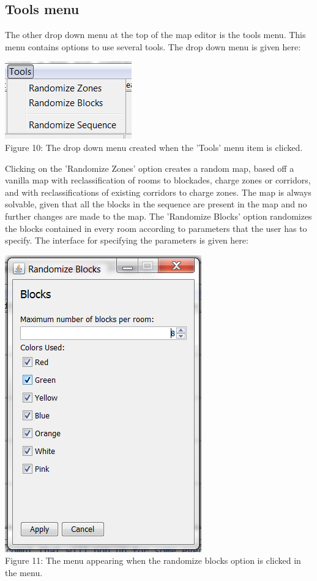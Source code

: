\subsection{Tools menu}
The other drop down menu at the top of the map editor is the tools menu. This menu contains options to use several tools. The drop down menu is given here:
\begin{center}
	\centering
	\includegraphics{EnvironmentStore/DropDownTools.png}\\
	Figure 10: The drop down menu created when the 'Tools' menu item is clicked.
\end{center}
Clicking on the 'Randomize Zones' option creates a random map, based off a vanilla map with reclassification of rooms to blockades, charge zones or corridors, and with reclassifications of existing corridors to charge zones. The map is always solvable, given that all the blocks in the sequence are present in the map and no further changes are made to the map. The 'Randomize Blocks' option randomizes the blocks contained in every room according to parameters that the user has to specify. The interface for specifying the parameters is given here:
\begin{center}
	\centering
	\includegraphics[scale=0.6]{EnvironmentStore/MenuBlocks.png}\\
	Figure 11: The menu appearing when the randomize blocks option is clicked in the menu.
\end{center}
